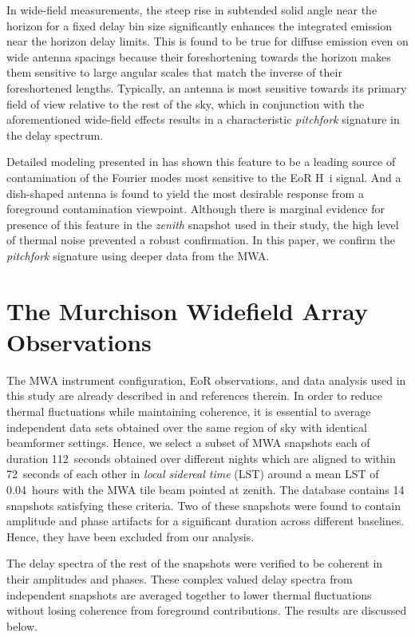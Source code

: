 \documentclass[preprint2,apjl,numberedappendix,twocolappendix,appendixfloats]{emulateapj}
\begin{document}
In wide-field measurements, the steep rise in subtended solid angle near the horizon for a fixed delay bin size significantly enhances the integrated emission near the horizon delay limits. This is found to be true for diffuse emission even on wide antenna spacings because their foreshortening towards the horizon makes them sensitive to large angular scales that match the inverse of their foreshortened lengths. Typically, an antenna is most sensitive towards its primary field of view relative to the rest of the sky, which in conjunction with the aforementioned wide-field effects results in a characteristic {\it pitchfork} signature in the delay spectrum. 

Detailed modeling presented in \citet{thy15} has shown this feature to be a leading source of contamination of the Fourier modes most sensitive to the EoR H~{\sc i} signal. And a dish-shaped antenna is found to yield the most desirable response from a foreground contamination viewpoint. Although there is marginal evidence for presence of this feature in the {\it zenith} snapshot used in their study, the high level of thermal noise prevented a robust confirmation. In this paper, we confirm the {\it pitchfork} signature using deeper data from the MWA.

\section{The Murchison Widefield Array Observations}\label{sec:MWA}

The MWA instrument configuration, EoR observations, and data analysis used in this study are already described in \citet{thy15} and references therein. In order to reduce thermal fluctuations while maintaining coherence, it is essential to average independent data sets obtained over the same region of sky with identical beamformer settings. Hence, we select a subset of MWA snapshots each of duration 112~seconds obtained over different nights which are aligned to within 72~seconds of each other in {\it local sidereal time} (LST) around a mean LST of 0.04~hours with the MWA tile beam pointed at zenith. The database contains 14 snapshots satisfying these criteria. Two of these snapshots were found to contain amplitude and phase artifacts for a significant duration across different baselines. Hence, they have been excluded from our analysis. 

The delay spectra of the rest of the snapshots were verified to be coherent in their amplitudes and phases. These complex valued delay spectra from independent snapshots are averaged together to lower thermal fluctuations without losing coherence from foreground contributions. The results are discussed below.
\end{document}

